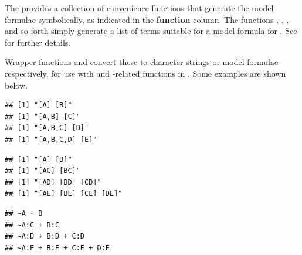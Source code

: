 \documentclass[11pt]{book}
\renewenvironment{knitrout}{\small\renewcommand{\baselinestretch}{.85}}{} %
\begin{document}
The  provides a collection of convenience functions that generate
the \loglin model formulae symbolically, as indicated in the \textbf{function} column.
The functions , , , 
and so forth simply
generate a list of terms suitable for a model formula for .
See  for further details.

Wrapper functions  and 
convert these to character strings or model formulae respectively,
for use with  and -related functions in
.  Some examples are shown below.

\begin{knitrout}
\color{fgcolor}\begin{kframe}
\begin{alltt}
  \hlopt{:}\hlstd{) \{}
  \hlstd{(}\hlstd{(} \hlstd{=LETTERS[}\hlopt{:}\hlstd{])))}
\hlstd{\}}
\end{alltt}
\begin{verbatim}
## [1] "[A] [B]"
## [1] "[A,B] [C]"
## [1] "[A,B,C] [D]"
## [1] "[A,B,C,D] [E]"
\end{verbatim}
\begin{alltt}
  \hlopt{:}\hlstd{) \{}
  \hlstd{(}\hlstd{(} \hlstd{=LETTERS[}\hlopt{:}\hlstd{]),} \hlstd{=}\hlstd{))}
\hlstd{\}}
\end{alltt}
\begin{verbatim}
## [1] "[A] [B]"
## [1] "[AC] [BC]"
## [1] "[AD] [BD] [CD]"
## [1] "[AE] [BE] [CE] [DE]"
\end{verbatim}
\begin{alltt}
  \hlopt{:}\hlstd{) \{}
  \hlstd{(}\hlstd{(} \hlstd{=LETTERS[}\hlopt{:}\hlstd{])))}
\hlstd{\}}
\end{alltt}
\begin{verbatim}
## ~A + B
## ~A:C + B:C
## ~A:D + B:D + C:D
## ~A:E + B:E + C:E + D:E
\end{verbatim}
\end{kframe}
\end{knitrout}
\end{document}

